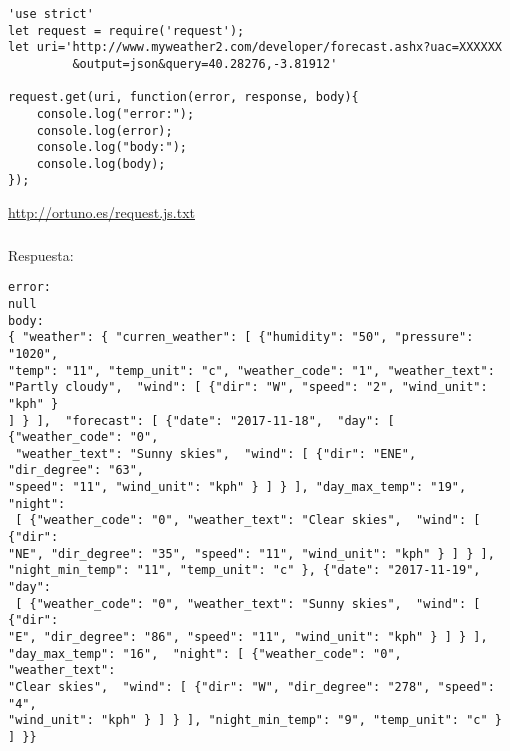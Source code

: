 \documentclass[ucs]{beamer}
\begin{document}
\begin{frame}[fragile]
\frametitle{}
  \begin{scriptsize}
  \begin{verbatim}
'use strict'
let request = require('request');
let uri='http://www.myweather2.com/developer/forecast.ashx?uac=XXXXXX
         &output=json&query=40.28276,-3.81912'

request.get(uri, function(error, response, body){
    console.log("error:");
    console.log(error);
    console.log("body:");
    console.log(body);
});
  \end{verbatim}
  \end{scriptsize}

\begin{tiny}
\begin{flushright}
\url{http://ortuno.es/request.js.txt}
\end{flushright}
\end{tiny}

\end{frame}

\begin{frame}[fragile]
\frametitle{}
Respuesta:

  \begin{scriptsize}
  \begin{verbatim}
error:
null
body:
{ "weather": { "curren_weather": [ {"humidity": "50", "pressure": "1020", 
"temp": "11", "temp_unit": "c", "weather_code": "1", "weather_text": 
"Partly cloudy",  "wind": [ {"dir": "W", "speed": "2", "wind_unit": "kph" } 
] } ],  "forecast": [ {"date": "2017-11-18",  "day": [ {"weather_code": "0",
 "weather_text": "Sunny skies",  "wind": [ {"dir": "ENE", "dir_degree": "63", 
"speed": "11", "wind_unit": "kph" } ] } ], "day_max_temp": "19",  "night":
 [ {"weather_code": "0", "weather_text": "Clear skies",  "wind": [ {"dir": 
"NE", "dir_degree": "35", "speed": "11", "wind_unit": "kph" } ] } ], 
"night_min_temp": "11", "temp_unit": "c" }, {"date": "2017-11-19",  "day":
 [ {"weather_code": "0", "weather_text": "Sunny skies",  "wind": [ {"dir": 
"E", "dir_degree": "86", "speed": "11", "wind_unit": "kph" } ] } ], 
"day_max_temp": "16",  "night": [ {"weather_code": "0", "weather_text": 
"Clear skies",  "wind": [ {"dir": "W", "dir_degree": "278", "speed": "4", 
"wind_unit": "kph" } ] } ], "night_min_temp": "9", "temp_unit": "c" } ] }}
  \end{verbatim}
  \end{scriptsize}

\end{frame}
\end{document}
